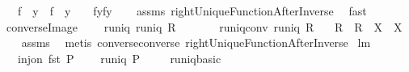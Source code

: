 \begin{isabellebody}
\ \ \ {\isachardoublequoteopen}{\isacharparenleft}f{\isacharcircum}{\isacharminus}{}\ {\isacharbackquote}{\isacharbackquote}\ {\isacharbraceleft}y{}{\isacharbraceright}\ {\isasyminter}\ f{\isacharcircum}{\isacharminus}{}\ {\isacharbackquote}{\isacharbackquote}\ {\isacharbraceleft}y{}{\isacharbraceright}\ {\isasymnoteq}\ {\isacharbraceleft}{\isacharbraceright}{\isacharparenright}\ {\isacharequal}\ {\isacharparenleft}f{\isacharcircum}{\isacharminus}{}{\isacharbackquote}{\isacharbackquote}{\isacharbraceleft}y{}{\isacharbraceright}{\isacharequal}f{\isacharcircum}{\isacharminus}{}{\isacharbackquote}{\isacharbackquote}{\isacharbraceleft}y{}{\isacharbraceright}{\isacharparenright}{\isachardoublequoteclose}\isanewline
%
\isadelimproof
\ \ %
\endisadelimproof
%
\isatagproof
{}\isamarkupfalse%
\ assms\ rightUniqueFunctionAfterInverse\ \isamarkupfalse%
\ fast%
\endisatagproof
{\isafoldproof}%
%
\isadelimproof
\isanewline
%
\endisadelimproof
\isanewline
{}\isamarkupfalse%
\ converse{\isacharunderscore}Image{\isacharcolon}\ \isanewline
\ \ \ runiq{\isacharcolon}\ {\isachardoublequoteopen}runiq\ R{\isachardoublequoteclose}\isanewline
\ \ \ \ \ \ \ runiq{\isacharunderscore}conv{\isacharcolon}\ {\isachardoublequoteopen}runiq\ {\isacharparenleft}R{\isacharcircum}{\isacharminus}{}{\isacharparenright}{\isachardoublequoteclose}\isanewline
\ \ \ {\isachardoublequoteopen}{\isacharparenleft}R{\isacharcircum}{\isacharminus}{}{\isacharparenright}\ {\isacharbackquote}{\isacharbackquote}\ R\ {\isacharbackquote}{\isacharbackquote}\ X\ {\isasymsubseteq}\ X{\isachardoublequoteclose}\ \isanewline
%
\isadelimproof
\ \ %
\endisadelimproof
%
\isatagproof
{}\isamarkupfalse%
\ assms\ \isamarkupfalse%
\ {\isacharparenleft}metis\ converse{\isacharunderscore}converse\ rightUniqueFunctionAfterInverse{\isacharparenright}%
\endisatagproof
{\isafoldproof}%
%
\isadelimproof
\isanewline
%
\endisadelimproof
\isanewline
{}\isamarkupfalse%
\ lm{}{}{\isacharcolon}\ \isanewline
\ \ \ {\isachardoublequoteopen}inj{\isacharunderscore}on\ fst\ P{\isachardoublequoteclose}\ \isanewline
\ \ \ {\isachardoublequoteopen}runiq\ P{\isachardoublequoteclose}\ \isanewline
%
\isadelimproof
\ \ %
\endisadelimproof
%
\isatagproof
{}\isamarkupfalse%
\ runiq{\isacharunderscore}basic\ \isanewline

\end{isabellebody}
